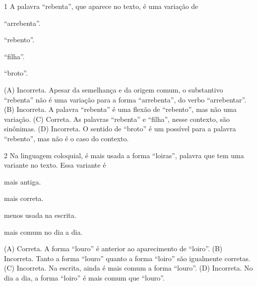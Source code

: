 \num{1} A palavra ``rebenta'', que aparece no texto, é uma variação de

\begin{escolha}
\item ``arrebenta''.

\item ``rebento''.

\item ``filha''.

\item ``broto''.
\end{escolha}


(A) Incorreta. Apesar da semelhança e da origem comum, o substantivo ``rebenta'' não é uma variação para a forma ``arrebenta'', do verbo ``arrebentar''.
(B) Incorreta. A palavra ``rebenta'' é uma flexão de ``rebento'', mas não uma variação.
(C) Correta. As palavras ``rebenta'' e ``filha'', nesse contexto, são sinônimas.
(D) Incorreta. O sentido de ``broto'' é um possível para a palavra ``rebento'', mas não é o caso do contexto.

\num{2} Na linguagem coloquial, é mais usada a forma ``loiras'', palavra que tem uma variante no texto. Essa variante é

\begin{escolha}
\item mais antiga.

\item mais correta.

\item menos usada na escrita.

\item mais comum no dia a dia.
\end{escolha}


(A) Correta. A forma ``louro'' é anterior ao aparecimento de ``loiro''.
(B) Incorreta. Tanto a forma ``louro'' quanto a forma ``loiro'' são igualmente corretas.
(C) Incorreta. Na escrita, ainda é mais comum a forma ``louro''.
(D) Incorreta. No dia a dia, a forma ``loiro'' é mais comum que ``louro''.

